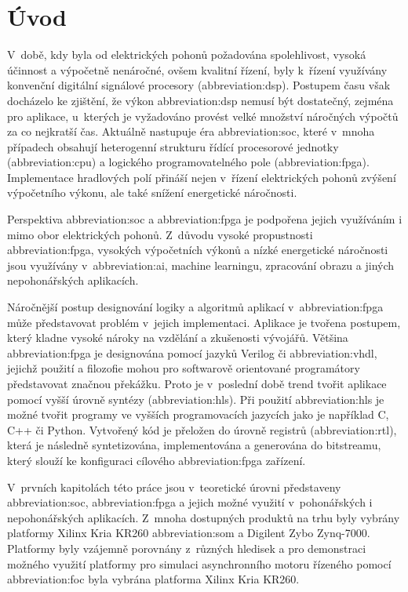 \documentclass[a4paper, twoside, 11pt]{article}
\begin{document}
\section{Úvod}
V~době, kdy byla od elektrických pohonů požadována spolehlivost, vysoká účinnost a výpočetně nenáročné, ovšem kvalitní řízení, byly k~řízení využívány konvenční digitální signálové procesory (\gls{abbreviation:dsp}). Postupem času však docházelo ke zjištění, že výkon \gls{abbreviation:dsp} nemusí být dostatečný, zejména pro aplikace, u~kterých je vyžadováno provést velké množství náročných výpočtů za co nejkratší čas. Aktuálně nastupuje éra \gls{abbreviation:soc}, které v~mnoha případech obsahují heterogenní strukturu řídící procesorové jednotky (\gls{abbreviation:cpu}) a logického programovatelného pole (\gls{abbreviation:fpga}). Implementace hradlových polí přináší nejen v~řízení elektrických pohonů zvýšení výpočetního výkonu, ale také snížení energetické náročnosti.\par
Perspektiva \gls{abbreviation:soc} a \gls{abbreviation:fpga} je podpořena jejich využíváním i mimo obor elektrických pohonů. Z~důvodu vysoké propustnosti \gls{abbreviation:fpga}, vysokých výpočetních výkonů a nízké energetické náročnosti jsou využívány v~\gls{abbreviation:ai}, machine learningu, zpracování obrazu a jiných nepohonářských aplikacích.\par
Náročnější postup designování logiky a algoritmů aplikací v~\gls{abbreviation:fpga} může představovat problém v~jejich implementaci. Aplikace je tvořena postupem, který kladne vysoké nároky na vzdělání a zkušenosti vývojářů. Většina \gls{abbreviation:fpga} je designována pomocí jazyků Verilog či \gls{abbreviation:vhdl}, jejichž použití a filozofie mohou pro softwarově orientované programátory představovat značnou překážku. Proto je v~poslední době trend tvořit aplikace pomocí vyšší úrovně syntézy (\gls{abbreviation:hls}). Při použití \gls{abbreviation:hls} je možné tvořit programy ve vyšších programovacích jazycích jako je například C, C++ či Python. Vytvořený kód je přeložen do úrovně registrů (\gls{abbreviation:rtl}), která je následně syntetizována, implementována a generována do bitstreamu, který slouží ke konfiguraci cílového \gls{abbreviation:fpga} zařízení.\par
V~prvních kapitolách této práce jsou v~teoretické úrovni představeny \gls{abbreviation:soc}, \gls{abbreviation:fpga} a jejich možné využití v~pohonářských i nepohonářských aplikacích. Z~mnoha dostupných produktů na trhu byly vybrány platformy Xilinx Kria KR260 \gls{abbreviation:som} a Digilent Zybo Zynq-7000. Platformy byly vzájemně porovnány z~různých hledisek a pro demonstraci možného využití platformy pro simulaci asynchronního motoru řízeného pomocí \gls{abbreviation:foc} byla vybrána platforma Xilinx Kria KR260.\par
\end{document}
